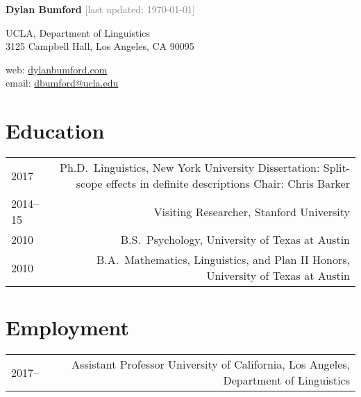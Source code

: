 \documentclass[12pt]{article}
\begin{document}
\textbf{Dylan Bumford}\hfill
\textcolor{gray}{[last updated: \today]}

\bigskip

\begin{minipage}[t]{0.55\textwidth}
UCLA, Department of Linguistics\\
3125 Campbell Hall, Los Angeles, CA 90095
\end{minipage}
\begin{minipage}[t]{\linegoal}
\raggedleft%
web: \href{https://dylanbumford.com}{dylanbumford.com}\\
email: \href{mailto:dbumford@ucla.edu}{dbumford@ucla.edu}
\end{minipage}

\bigskip
\bigskip

\section*{Education}

\begin{longtable}{LR}
  2017        & Ph.D.~Linguistics, New York University\newline
                Dissertation: Split-scope effects in definite descriptions\newline
                Chair: Chris Barker
                \\
  2014--15    & Visiting Researcher, Stanford University\\
  2010        & B.S.~Psychology, University of Texas at Austin\\
  2010        & B.A.~Mathematics, Linguistics, and Plan II Honors, University of
                Texas at Austin
\end{longtable}

\medskip

\section*{Employment}

\begin{longtable}{LR}
  2017--    & Assistant Professor\newline
              University of California, Los Angeles, Department of Linguistics
\end{longtable}

\medskip
\end{document}
